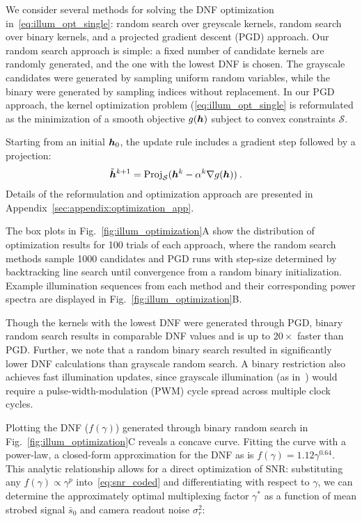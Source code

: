 We consider several methods for solving the DNF optimization in~\eqref{eq:illum_opt_single}: random search over greyscale kernels, random search over binary kernels, and a projected gradient descent (PGD) approach. Our random search approach is simple: a fixed number of candidate kernels are randomly generated, and the one with the lowest DNF is chosen. The grayscale candidates were generated by sampling uniform random variables, while the binary were generated by sampling indices without replacement. In our PGD approach, the kernel optimization problem (\eqref{eq:illum_opt_single} is reformulated as the minimization of a smooth objective $g(\bm{h})$ subject to convex constraints $\mathcal{S}$.  

Starting from an initial $\bm{h}_0$, the update rule includes a gradient step followed by a projection:
\begin{align*}
    \tilde {\bm{h}}^{k+1} &= \mathrm{Proj}_{\mathcal{S}}(\bm{h}^k - \alpha^k \nabla g(\bm{h}))\:.
\end{align*} 
Details of the reformulation and optimization approach are presented in Appendix~\ref{sec:appendix:optimization_app}.

The box plots in Fig.~\ref{fig:illum_optimization}A show the distribution of optimization results for 100 trials of each approach, where the random search methods sample 1000 candidates and PGD runs with step-size determined by backtracking line search until convergence from a random binary initialization. Example illumination sequences from each method and their corresponding power spectra are displayed in Fig.~\ref{fig:illum_optimization}B.

Though the kernels with the lowest DNF were generated through PGD, binary random search results in comparable DNF values and is up to $20\times$ faster than PGD. Further, we note that a random binary search resulted in significantly lower DNF calculations than grayscale random search. A binary restriction also achieves fast illumination updates, since grayscale illumination (as in~\cite{Ma:15}) would require a pulse-width-modulation (PWM) cycle spread across multiple clock cycles.  

Plotting the DNF ($f(\gamma)$) generated through binary random search in Fig.~\ref{fig:illum_optimization}C reveals a concave curve. Fitting the curve with a power-law, a closed-form approximation for the DNF as is $f(\gamma)=1.12\gamma^{0.64}$. This analytic relationship allows for a direct optimization of SNR: substituting any $f(\gamma) \propto \gamma^p$ into~\eqref{eq:snr_coded} and differentiating with respect to $\gamma$, we can determine the approximately optimal multiplexing factor $\gamma^*$ as a function of mean strobed signal $\bar{s}_0$ and camera readout noise $\sigma_r^2$:

